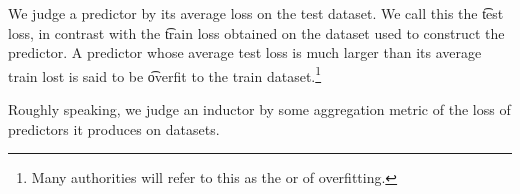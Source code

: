 We judge a predictor by its average loss on the test dataset.
We call this the \t{test loss}, in contrast with the \t{train loss} obtained on the dataset used to construct the predictor.
A predictor whose average test loss is much larger than its average train lost is said to be \t{overfit} to the train dataset.\footnote{Many authorities will refer to this as the  or  of overfitting.}

Roughly speaking, we judge an inductor by some aggregation metric of the loss of predictors it produces on datasets.
